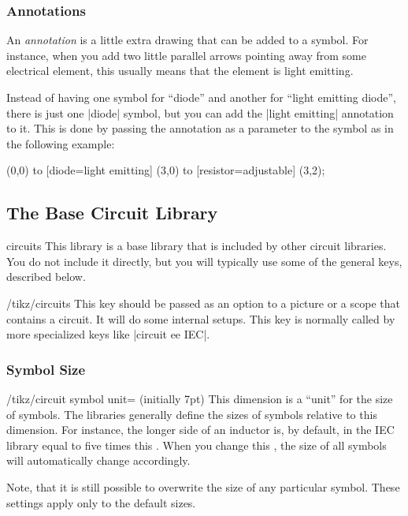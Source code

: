 \subsubsection{Annotations}

An \emph{annotation} is a little extra drawing that can be added to a symbol.
For instance, when you add two little parallel arrows pointing away from some
electrical element, this usually means that the element is light emitting.

Instead of having one symbol for ``diode'' and another for ``light emitting
diode'', there is just one |diode| symbol, but you can add the |light emitting|
annotation to it. This is done by passing the annotation as a parameter to the
symbol as in the following example:
%
\begin{codeexample}[]
  \draw (0,0) to [diode={light emitting}] (3,0)
              to [resistor={adjustable}]  (3,2);
\end{codeexample}


\subsection{The Base Circuit Library}

\begin{tikzlibrary}{circuits}
    This library is a base library that is included by other circuit libraries.
    You do not include it directly, but you will typically use some of the
    general keys, described below.
\end{tikzlibrary}

\begin{key}{/tikz/circuits}
  This key should be passed as an option to a picture or a scope that contains
  a circuit. It will do some internal setups. This key is normally called by
  more specialized keys like |circuit ee IEC|.
\end{key}


\subsubsection{Symbol Size}

\begin{key}{/tikz/circuit symbol unit= (initially 7pt)}
    This dimension is a ``unit'' for the size of symbols. The libraries
    generally define the sizes of symbols relative to this dimension. For
    instance, the longer side of an inductor is, by default, in the IEC library
    equal to five times this . When you change this
    , the size of all symbols will automatically change
    accordingly.

    Note, that it is still possible to overwrite the size of any particular
    symbol. These settings apply only to the default sizes.
\begin{codeexample}[]
\end{codeexample}
\end{key}

